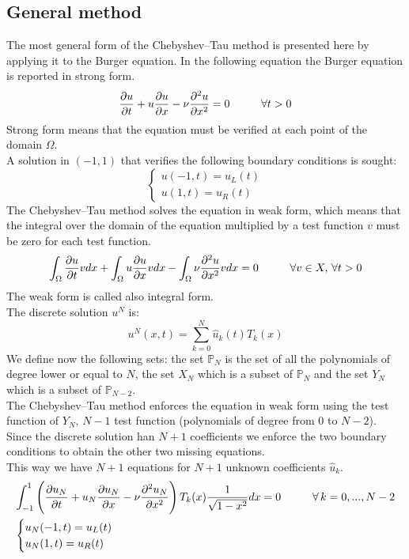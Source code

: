 \subsection{General method}
The most general form of the Chebyshev--Tau method is presented here by applying it to the Burger equation. In the following equation the Burger equation is reported in strong form.
\begin{equation}
\frac{\partial u}{\partial t}+u\frac{\partial u}{\partial x}-\nu \frac{\partial^2 u}{\partial x^2}=0\hspace{1cm}  \forall t>0
\end{equation}
Strong form means that the equation must be verified at each point of the domain $\Omega$.\\
A solution in $(-1,1)$ that verifies the following boundary conditions is sought:
\[
\begin{cases}
u(-1,t)=u_L(t)\\
u(1,t)=u_R(t)
\end{cases}
\]
The Chebyshev--Tau method solves the equation in weak form, which means that the integral over the domain of the equation multiplied by a test function $v$ must be zero for each test function.
\begin{equation}
\int_\Omega \frac{\partial u}{\partial t}vdx+\int_\Omega u\frac{\partial u}{\partial x}vdx-\int_\Omega\nu\frac{\partial^2 u}{\partial x^2}vdx=0  \hspace{1cm}  \forall v\in X,\,\forall t>0
\end{equation}
The weak form is called also integral form.\\
The discrete solution $u^N$ is:
\[
u^N(x,t)=\sum_{k=0}^N\hat u_k(t)T_k(x)
\]
We define now the following sets: the set $\mathbb{P}_N$ is the set of all the polynomials of degree lower or equal to $N$, the set $X_N$ which is a subset of $\mathbb{P}_N$ and the set $Y_N$ which is a subset of $\mathbb{P}_{N-2}$. \\
The Chebyshev--Tau method enforces the equation in weak form using the test function of $Y_N$, $N-1$ test function (polynomials of degree from 0 to $N-2$). Since the discrete solution han $N+1$ coefficients we enforce the two boundary conditions to obtain the other two missing equations.\\
This way we have $N+1$ equations for $N+1$ unknown coefficients $\hat u_k$.
\begin{equation}\begin{array}{l}
\displaystyle\int_{-1}^{1}\left( \dfrac{\partial u_N}{\partial t}+u_N\dfrac{\partial u_N}{\partial x}-\nu\dfrac{\partial^2u_N}{\partial x^2}  \right)T_k(x)\dfrac{1}{\sqrt{1-x^2}}dx=0  \hspace{1cm}  \forall \,k=0,...,N-2  
\\[3ex]
\begin{cases}
u_N(-1,t)=u_L(t)\\
u_N(1,t)=u_R(t)
\end{cases}
\end{array}
\end{equation}
